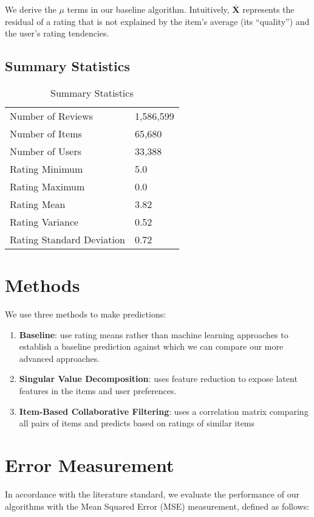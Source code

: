 \documentclass[12pt]{article}
\begin{document}
We derive the $\mu$ terms in our baseline algorithm. Intuitively, $\mathbf{\bar X}$ represents the residual of a rating that is not explained by the item's average (its ``quality'') and the user's rating tendencies.

\subsection{Summary Statistics}

\begin{table}[ht!]
\centering
\caption{Summary Statistics}
\begin{tabular}{ll}
\hline
Number of Reviews         & 1,586,599 \\
Number of Items           & 65,680    \\
Number of Users           & 33,388    \\
Rating Minimum            & 5.0       \\
Rating Maximum            & 0.0       \\
Rating Mean               & 3.82      \\
Rating Variance           & 0.52      \\
Rating Standard Deviation & 0.72      \\ \hline
\end{tabular}
\end{table}

\section{Methods}
We use three methods to make predictions:

\begin{enumerate}
  \item \textbf{Baseline}: use rating means rather than machine learning approaches to establish a baseline prediction against which we can compare our more advanced approaches.
  \item \textbf{Singular Value Decomposition}: uses feature reduction to expose latent features in the items and user preferences.
  \item \textbf{Item-Based Collaborative Filtering}: uses a correlation matrix comparing all pairs of items and predicts based on ratings of similar items
\end{enumerate}

\section{Error Measurement}
In accordance with the literature standard, we evaluate the performance of our algorithms with the Mean Squared Error (MSE) measurement, defined as follows:
\end{document}
